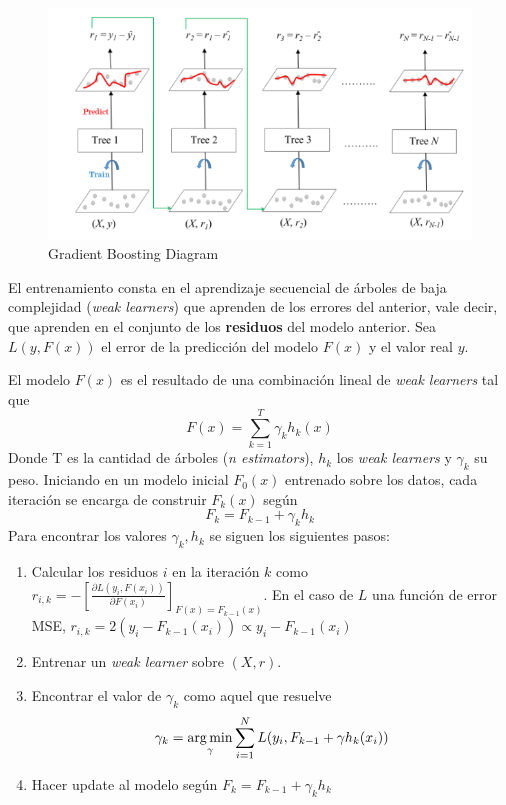 \begin{figure}[H]
    \center
    \includegraphics[scale=0.5]{notebooks/ML/img/gbc_diagram.png}
    \caption{Gradient Boosting Diagram}
\end{figure}

El entrenamiento consta en el aprendizaje secuencial de árboles de baja complejidad (\textit{weak learners}) que aprenden de los errores del anterior, vale decir, que aprenden en el conjunto de los \textbf{residuos} del modelo anterior. Sea $L(y , F(x))$ el error de la predicción del modelo $F(x)$ y el valor real $y$. 

El modelo $F(x)$ es el resultado de una combinación lineal de \textit{weak learners} tal que 
$$ 
F(x) = \sum_{k=1}^T \gamma_k h_k(x)
$$
Donde T es la cantidad de árboles (\textit{n estimators}), $h_k$ los  \textit{weak learners} y $\gamma_k$ su peso. Iniciando en un modelo inicial $F_0(x)$ entrenado sobre los datos, cada iteración se encarga de construir $F_{k}(x)$ según 
$$ 
F_{k} = F_{k-1} + \gamma_{k}h_{k}
$$
Para encontrar los valores $\gamma_{k} , h_{k}$ se siguen los siguientes pasos: 
\begin{enumerate}
    \item Calcular los residuos $i$ en la iteración $k$ como $r_{i,k} = - \left [ \frac{\partial L(y_i, F(x_i))}{\partial F(x_i)} \right ]_{F(x) = F_{k-1}(x)}$. En el caso de $L$ una función de error MSE, $r_{i,k} = 2(y_i - F_{k-1}(x_i)) \propto y_i - F_{k-1}(x_i)$
    \item Entrenar un \textit{weak learner} sobre $(X, r)$.
    \item Encontrar el valor de $\gamma_k$ como aquel que resuelve 
    $$ 
    \gamma_k = \operatorname*{arg\,min}_{\gamma}\sum_{i=1}^N L(y_i , F_{k-1} + \gamma h_{k}(x_i))
    $$
    \item Hacer update al modelo según $F_{k} = F_{k-1} + \gamma_{k}h_{k}$
\end{enumerate}

